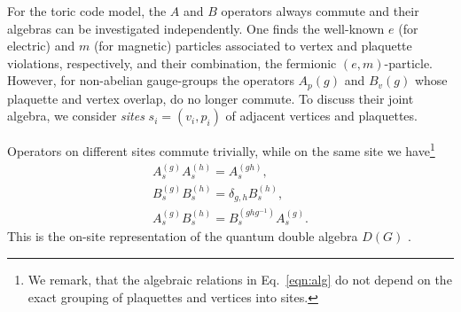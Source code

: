 \documentclass[two column]{article}
\newcommand{\jovan}[1]{\textcolor{blue}{[#1]}}
\begin{document}
For the toric code model, the $A$ and $B$ operators always commute and their algebras can be investigated independently. One finds the well-known $e$ (for electric) and $m$ (for magnetic) particles associated to vertex and plaquette violations, respectively, and their combination, the fermionic $(e,m)$-particle. However, for non-abelian gauge-groups the operators $A_p(g)$ and $B_v(g)$ whose plaquette and vertex overlap, do no longer commute. To discuss their joint algebra, we consider \emph{sites}
 $s_i = (v_i, p_i)$ of adjacent vertices and plaquettes.
%
%

%
 
Operators on different sites commute trivially, while on the same site we have\footnote{We remark, that the algebraic relations in Eq.~\eqref{eqn:alg} do not depend on the exact grouping of plaquettes and vertices into sites.} 
\begin{equation}
    \begin{split}
        A_s^{(g)}A_s^{(h)} = A_s^{(gh)}, \\
        B_s^{(g)}B_s^{(h)} = \delta_{g,h} B_s^{(h)},\\
        A_s^{(g)}B_s^{(h)} = B_s^{(ghg^{-1})}A_s^{(g)}.
    \end{split}\label{eqn:alg}
\end{equation}
This is the on-site representation of the quantum double algebra $D(G)$ 
\cite{cui2018topological, Kitaev_2003}. 
\end{document}
